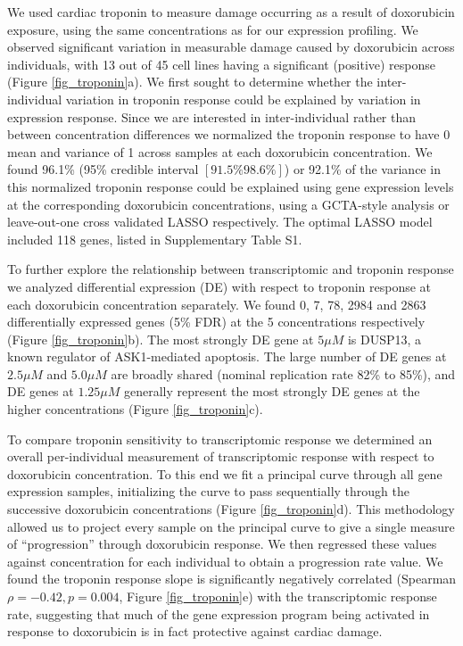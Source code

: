 \documentclass{article}
\begin{document}
{We used cardiac troponin to measure damage occurring as a result of doxorubicin exposure, using the same concentrations as for our expression profiling. We observed significant variation in measurable damage caused by doxorubicin across individuals, with 13 out of 45 cell lines having a significant (positive) response (Figure \ref{fig_troponin}a). We first sought to determine whether the inter-individual variation in troponin response could be explained by variation in expression response. Since we are interested in inter-individual rather than between concentration differences we normalized the troponin response to have 0 mean and variance of 1 across samples at each doxorubicin concentration. We found 96.1\% (95\% credible interval $[91.5\% 98.6\%]$) or 92.1\% of the variance in this normalized troponin response could be explained using gene expression levels at the corresponding doxorubicin concentrations, using a GCTA-style analysis\cite{gcta} or leave-out-one cross validated LASSO\cite{lasso} respectively. The optimal LASSO model included 118 genes, listed in Supplementary Table S1. 

To further explore the relationship between transcriptomic and troponin response we analyzed differential expression (DE) with respect to troponin response at each doxorubicin concentration separately. We found 0, 7, 78, 2984 and 2863 differentially expressed genes (5\% FDR) at the 5 concentrations respectively (Figure \ref{fig_troponin}b). The most strongly DE gene at $5 \mu M$ is DUSP13, a known regulator of ASK1-mediated apoptosis\cite{park2010positive}. The large number of DE genes at $2.5 \mu M$ and $5.0 \mu M$ are broadly shared (nominal replication rate 82\% to 85\%), and DE genes at $1.25 \mu M$ generally represent the most strongly DE genes at the higher concentrations (Figure \ref{fig_troponin}c). 

To compare troponin sensitivity to transcriptomic response we determined an overall per-individual measurement of transcriptomic response with respect to doxorubicin concentration. To this end we fit a principal curve\citep{princurve} through all gene expression samples, initializing the curve to pass sequentially through the successive doxorubicin concentrations (Figure \ref{fig_troponin}d). This methodology allowed us to project every sample on the principal curve to give a single measure of ``progression'' through doxorubicin response. We then regressed these values against concentration for each individual to obtain a progression rate value. We found the troponin response slope is significantly negatively correlated (Spearman $\rho=-0.42, p=0.004$, Figure \ref{fig_troponin}e) with the transcriptomic response rate, suggesting that much of the gene expression program being activated in response to doxorubicin is in fact protective against cardiac damage. 

}
\end{document}
